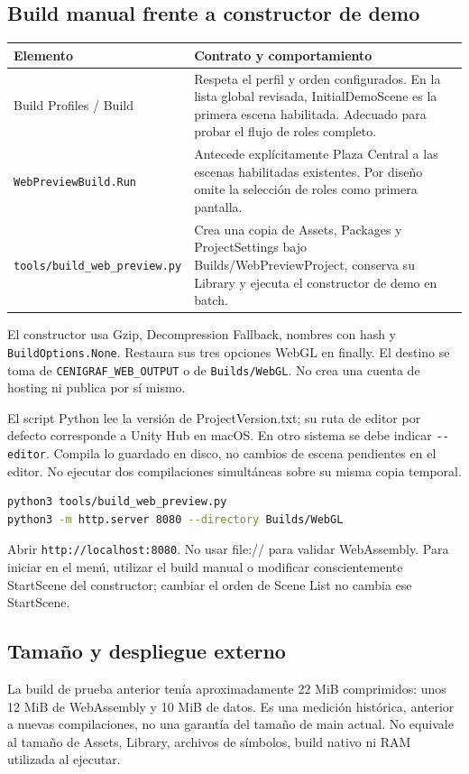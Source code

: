 \documentclass[11pt,letterpaper,oneside]{article}
\makeatletter
\newcommand{\code}[1]{\nolinkurl{#1}}
\newenvironment{spec}{\begingroup\small\begin{longtable}{@{}>{\raggedright\arraybackslash}p{0.32\textwidth}>{\raggedright\arraybackslash}p{0.64\textwidth}@{}}\toprule\textbf{Elemento} & \textbf{Contrato y comportamiento} \\ \midrule\endhead}{\bottomrule\end{longtable}\endgroup}
\makeatother
\begin{document}
\subsection{Build manual frente a constructor de demo}
\begin{spec}
Build Profiles / Build & Respeta el perfil y orden configurados. En la lista global revisada, InitialDemoScene es la primera escena habilitada. Adecuado para probar el flujo de roles completo. \\
\code{WebPreviewBuild.Run} & Antecede explícitamente Plaza Central a las escenas habilitadas existentes. Por diseño omite la selección de roles como primera pantalla. \\
\code{tools/build_web_preview.py} & Crea una copia de Assets, Packages y ProjectSettings bajo Builds/WebPreviewProject, conserva su Library y ejecuta el constructor de demo en batch. \\
\end{spec}
El constructor usa Gzip, Decompression Fallback, nombres con hash y \code{BuildOptions.None}. Restaura sus tres opciones WebGL en finally. El destino se toma de \code{CENIGRAF_WEB_OUTPUT} o de \code{Builds/WebGL}. No crea una cuenta de hosting ni publica por sí mismo.

El script Python lee la versión de ProjectVersion.txt; su ruta de editor por defecto corresponde a Unity Hub en macOS. En otro sistema se debe indicar \code{--editor}. Compila lo guardado en disco, no cambios de escena pendientes en el editor. No ejecutar dos compilaciones simultáneas sobre su misma copia temporal.

\begin{lstlisting}[language=bash]
python3 tools/build_web_preview.py
python3 -m http.server 8080 --directory Builds/WebGL
\end{lstlisting}
Abrir \code{http://localhost:8080}. No usar file:// para validar WebAssembly. Para iniciar en el menú, utilizar el build manual o modificar conscientemente StartScene del constructor; cambiar el orden de Scene List no cambia ese StartScene.

\subsection{Tamaño y despliegue externo}
La build de prueba anterior tenía aproximadamente 22 MiB comprimidos: unos 12 MiB de WebAssembly y 10 MiB de datos. Es una medición histórica, anterior a nuevas compilaciones, no una garantía del tamaño de main actual. No equivale al tamaño de Assets, Library, archivos de símbolos, build nativo ni RAM utilizada al ejecutar.
\end{document}
